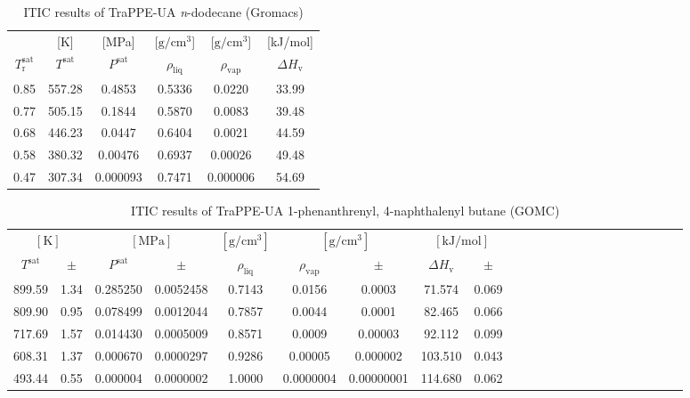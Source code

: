 \documentclass[%
 aip,
 jcp,
 sd,%
 amsmath,amssymb,
]{revtex4-1}
\begin{document}
\begin{table*}[!htbp]
\centering
\caption{
ITIC results of TraPPE-UA \textit{n}-dodecane (Gromacs)
}
\label{tab:TraPPE-C12-trappe-gmx}
\begin{ruledtabular}
\begin{tabular}{cccccc}
 & {[}K{]} &	 {[}MPa{]} & {[}$\mathrm{g/cm^3}${]} & {[}$\mathrm{g/cm^3}${]}	& {[}kJ/mol{]}  \\
$T_\mathrm{r}^{\mathrm{sat}}$ & $T^{\mathrm{sat}}$ & $P^{\mathrm{sat}}$ & $\rho_{\mathrm{liq}}$ & $\rho_{\mathrm{vap}}$ & $\Delta H_{\mathrm{v}}$ \\
\hline													
0.85	&	557.28	&	0.4853	&	0.5336	&	0.0220	&	33.99	\\
0.77	&	505.15	&	0.1844	&	0.5870	&	0.0083	&	39.48	\\
0.68	&	446.23	&	0.0447	&	0.6404	&	0.0021	&	44.59	\\
0.58	&	380.32	&	0.00476	&	0.6937	&	0.00026	&	49.48	\\
0.47	&	307.34	&	0.000093	&	0.7471	&	0.000006	&	54.69	\\
\end{tabular}
\end{ruledtabular}
\end{table*}


\begin{table*}[]
\centering
\caption{
ITIC results of TraPPE-UA 1-phenanthrenyl, 4-naphthalenyl butane (GOMC)
}
\label{tab:TraPPE-1p4nB}
\begin{ruledtabular}
\begin{tabular}{ccccccccccccccccccccccc}
\multicolumn{2}{c}{$[\mathrm{K}]$} &	 \multicolumn{2}{c}{$[\mathrm{MPa}]$} & $[\mathrm{g/cm^3}]$ & \multicolumn{2}{c}{$[\mathrm{g/cm^3}]$} & \multicolumn{2}{c}{$[\mathrm{kJ/mol}]$} \\
$T^{\mathrm{sat}}$ & $\pm$ & $P^{\mathrm{sat}}$ & $\pm$ & $\rho_{\mathrm{liq}}$ & $\rho_{\mathrm{vap}}$ & $\pm$ & $\Delta H_{\mathrm{v}}$ & $\pm$
 \\
\hline		
899.59	&	1.34	&	0.285250	&	0.0052458	&	0.7143	&	0.0156	&	0.0003	&	71.574	&	0.069	\\
809.90	&	0.95	&	0.078499	&	0.0012044	&	0.7857	&	0.0044	&	0.0001	&	82.465	&	0.066	\\
717.69	&	1.57	&	0.014430	&	0.0005009	&	0.8571	&	0.0009	&	0.00003	&	92.112	&	0.099	\\
608.31	&	1.37	&	0.000670	&	0.0000297	&	0.9286	&	0.00005	&	0.000002	&	103.510	&	0.043	\\
493.44	&	0.55	&	0.000004	&	0.0000002	&	1.0000	&	0.0000004	&	0.00000001	&	114.680	&	0.062	\\
\end{tabular}
\end{ruledtabular}
\end{table*}
\end{document}
